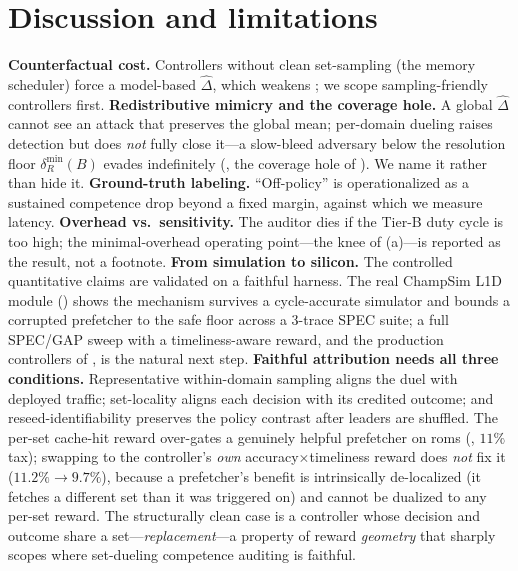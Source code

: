 \documentclass{article}
\newcommand{\dhat}{\hat{\Delta}}
\begin{document}
\section{Discussion and limitations}\label{sec:disc}
\textbf{Counterfactual cost.} Controllers without clean set-sampling (the memory
scheduler) force a model-based $\dhat$, which weakens ; we
scope sampling-friendly controllers first. \textbf{Redistributive mimicry and the
coverage hole.} A global $\dhat$ cannot see an attack that preserves the global
mean; per-domain dueling raises detection but does \emph{not} fully close it---a
slow-bleed adversary below the resolution floor $\delta_R^{\min}(B)$ evades
indefinitely (, the coverage hole of ). We name
it rather than hide it.
\textbf{Ground-truth labeling.} ``Off-policy'' is operationalized as a sustained
competence drop beyond a fixed margin, against which we measure latency.
\textbf{Overhead vs.\ sensitivity.} The auditor dies if the Tier-B duty cycle is
too high; the minimal-overhead operating point---the knee of (a)---is
reported as the result, not a footnote. \textbf{From simulation to silicon.} The
controlled quantitative claims are validated on a faithful harness. The real
ChampSim L1D module () shows the mechanism survives a
cycle-accurate simulator and bounds a corrupted prefetcher to the safe floor
across a 3-trace SPEC suite; a full SPEC/GAP sweep with a timeliness-aware reward,
and the production controllers of , is the natural next step.
\textbf{Faithful attribution needs all three conditions.} Representative
within-domain sampling aligns the duel with deployed traffic; set-locality aligns
each decision with its credited outcome; and reseed-identifiability preserves
the policy contrast after leaders are shuffled. The per-set
cache-hit reward over-gates a genuinely helpful prefetcher on roms
(, $11\%$ tax); swapping to the controller's \emph{own}
accuracy$\times$timeliness reward does \emph{not} fix it ($11.2\%\!\to\!9.7\%$),
because a prefetcher's benefit is intrinsically de-localized (it fetches a
different set than it was triggered on) and cannot be dualized to any per-set
reward. The structurally clean case is a controller whose decision and outcome
share a set---\emph{replacement}---a property of reward \emph{geometry} that
sharply scopes where set-dueling competence auditing is faithful.
\end{document}
